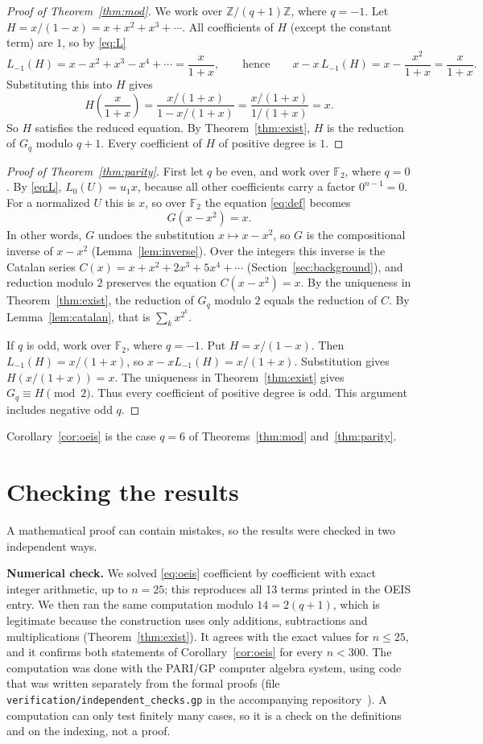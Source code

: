 \documentclass[11pt,a4paper]{article}
\theoremstyle{definition}
\theoremstyle{remark}
\newcommand{\Z}{\mathbb{Z}}
\newcommand{\F}{\mathbb{F}}
\newcommand{\para}[1]{\par\medskip\noindent\textbf{#1}\enspace}
\begin{document}
\begin{proof}[Proof of Theorem~\ref{thm:mod}]
We work over $\Z/(q+1)\Z$, where $q=-1$. Let $H=x/(1-x)=x+x^2+x^3+\cdots$. All coefficients of $H$ (except the
constant term) are $1$, so by \eqref{eq:L}
\[
L_{-1}(H)=x-x^2+x^3-x^4+\cdots=\frac{x}{1+x},
\qquad\text{hence}\qquad
x-x\,L_{-1}(H)=x-\frac{x^2}{1+x}=\frac{x}{1+x}.
\]
Substituting this into $H$ gives
\[
H\!\left(\frac{x}{1+x}\right)=\frac{x/(1+x)}{1-x/(1+x)}=\frac{x/(1+x)}{1/(1+x)}=x .
\]
So $H$ satisfies the reduced equation. By Theorem~\ref{thm:exist}, $H$ is the reduction of $G_q$ modulo $q+1$. Every
coefficient of $H$ of positive degree is $1$.
\end{proof}

\begin{proof}[Proof of Theorem~\ref{thm:parity}]
First let $q$ be even, and work over $\F_2$, where $q=0$. By \eqref{eq:L}, $L_0(U)=u_1x$, because all other
coefficients carry a factor $0^{n-1}=0$. For a normalized $U$ this is $x$, so over $\F_2$ the equation
\eqref{eq:def} becomes
\[
G(x-x^2)=x .
\]
In other words, $G$ undoes the substitution $x\mapsto x-x^2$, so $G$ is the compositional inverse of $x-x^2$
(Lemma~\ref{lem:inverse}). Over the integers this inverse is the Catalan series $C(x)=x+x^2+2x^3+5x^4+\cdots$
(Section~\ref{sec:background}), and reduction modulo $2$ preserves the equation $C(x-x^2)=x$. By the uniqueness in
Theorem~\ref{thm:exist}, the reduction of $G_q$ modulo $2$ equals the reduction of $C$. By Lemma~\ref{lem:catalan}, that
is $\sum_kx^{2^k}$.

If $q$ is odd, work over $\F_2$, where $q=-1$. Put $H=x/(1-x)$.
Then $L_{-1}(H)=x/(1+x)$, so $x-xL_{-1}(H)=x/(1+x)$.
Substitution gives $H(x/(1+x))=x$.
The uniqueness in Theorem~\ref{thm:exist} gives $G_q\equiv H\pmod2$.
Thus every coefficient of positive degree is odd. This argument includes negative odd $q$.
\end{proof}

Corollary~\ref{cor:oeis} is the case $q=6$ of Theorems~\ref{thm:mod} and~\ref{thm:parity}.

\section{Checking the results}\label{sec:checks}

A mathematical proof can contain mistakes, so the results were checked in two independent ways.

\para{Numerical check.}
We solved \eqref{eq:oeis} coefficient by coefficient with exact integer arithmetic, up to $n=25$; this
reproduces all 13 terms printed in the OEIS entry. We then ran the same computation
modulo $14=2(q+1)$, which is legitimate because the construction uses only additions,
subtractions and multiplications (Theorem~\ref{thm:exist}). It agrees with the exact values for $n\le25$, and it confirms
both statements of Corollary~\ref{cor:oeis} for every $n<300$.
The computation was done with the PARI/GP computer algebra system, using code that was written separately from the
formal proofs (file \texttt{verification/independent\_checks.gp} in the accompanying repository~\cite{repo}).
A computation can only test finitely many cases, so it is a check on the definitions and on the indexing, not a proof.
\end{document}

